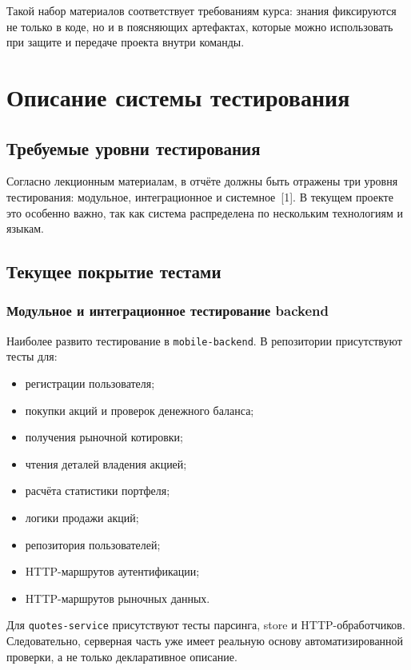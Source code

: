 \documentclass[12pt,a4paper]{article}
\begin{document}
Такой набор материалов соответствует требованиям курса: знания фиксируются не только в коде, но и в поясняющих артефактах, которые можно использовать при защите и передаче проекта внутри команды.

\section{Описание системы тестирования}

\subsection{Требуемые уровни тестирования}

Согласно лекционным материалам, в отчёте должны быть отражены три уровня тестирования: модульное, интеграционное и системное~[1]. В текущем проекте это особенно важно, так как система распределена по нескольким технологиям и языкам.

\subsection{Текущее покрытие тестами}

\subsubsection{Модульное и интеграционное тестирование backend}

Наиболее развито тестирование в \texttt{mobile-backend}. В репозитории присутствуют тесты для:

\begin{itemize}[leftmargin=1.2cm]
    \item регистрации пользователя;
    \item покупки акций и проверок денежного баланса;
    \item получения рыночной котировки;
    \item чтения деталей владения акцией;
    \item расчёта статистики портфеля;
    \item логики продажи акций;
    \item репозитория пользователей;
    \item HTTP-маршрутов аутентификации;
    \item HTTP-маршрутов рыночных данных.
\end{itemize}

Для \texttt{quotes-service} присутствуют тесты парсинга, store и HTTP-обработчиков. Следовательно, серверная часть уже имеет реальную основу автоматизированной проверки, а не только декларативное описание.
\end{document}
